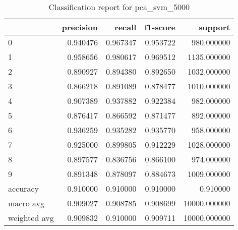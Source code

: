 \begin{table}[htb!]
\centering
\caption{Classification report for pca_svm_5000}
\label{tab:classification-report-pca_svm_5000}
\begin{tabular}{lrrrr}
\toprule
 & precision & recall & f1-score & support \\
\midrule
0 & 0.940476 & 0.967347 & 0.953722 & 980.000000 \\
1 & 0.958656 & 0.980617 & 0.969512 & 1135.000000 \\
2 & 0.890927 & 0.894380 & 0.892650 & 1032.000000 \\
3 & 0.866218 & 0.891089 & 0.878477 & 1010.000000 \\
4 & 0.907389 & 0.937882 & 0.922384 & 982.000000 \\
5 & 0.876417 & 0.866592 & 0.871477 & 892.000000 \\
6 & 0.936259 & 0.935282 & 0.935770 & 958.000000 \\
7 & 0.925000 & 0.899805 & 0.912229 & 1028.000000 \\
8 & 0.897577 & 0.836756 & 0.866100 & 974.000000 \\
9 & 0.891348 & 0.878097 & 0.884673 & 1009.000000 \\
accuracy & 0.910000 & 0.910000 & 0.910000 & 0.910000 \\
macro avg & 0.909027 & 0.908785 & 0.908699 & 10000.000000 \\
weighted avg & 0.909832 & 0.910000 & 0.909711 & 10000.000000 \\
\bottomrule
\end{tabular}
\end{table}
